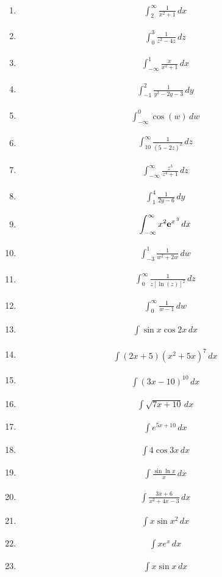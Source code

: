 \documentclass[twoside, fleqn,12pt,letterpaper]{book}
\newcommand{\makeitem}[2]{\item {#2}\begin{align*} {#1}
  \end{align*}}
\newcommand{\makeitemblack}[1]{\makeitem{{#1}}{\cite{bprp}}}
\newcommand{\makeitemlamar}[1]{\makeitem{{#1}}{\cite{lamar}}}
\begin{document}
\begin{multicols}{2}
\begin{enumerate}
  \makeitemlamar{\displaystyle \int_{2}^{\infty }{{\frac{1}{{{x^2} + 1}}\,dx}}}
  
  \makeitemlamar{\displaystyle \int_{0}^{3}{{\frac{1}{{{z^2} - 4z}}\,dz}}}
  
  \makeitemlamar{\displaystyle \int_{{ - \infty }}^{1}{{\frac{x}{{{x^2} + 1}}\,dx}}}
  
  \makeitemlamar{\displaystyle \int_{{ - 1}}^{2}{{\frac{1}{{{y^2} - 2y - 3}}\,dy}}}
  
  \makeitemlamar{\displaystyle \int_{{ - \infty }}^{0}{{\cos \left( w \right)\,dw}}}
  
  \makeitemlamar{\displaystyle \int_{{10}}^{\infty }{{\frac{1}{{{{\left( {5 - 2z} \right)}^2}}}\,dz}}}
  
  \makeitemlamar{\displaystyle \int_{{ - \infty }}^{\infty }{{\frac{{{z^3}}}{{{z^4} + 1}}\,dz}}}
  
  \makeitemlamar{\displaystyle \int_{1}^{4}{{\frac{1}{{2y - 6}}\,dy}}}
  
  \makeitemlamar{\displaystyle \int_{{ - \infty }}^{\infty }{{{x^2}{{\bf{e}}^{{x^{\,3}}}}\,dx}}}
  
  \makeitemlamar{\displaystyle \int_{{ - 3}}^{1}{{\frac{1}{{{w^2} + 2w}}\,dw}}}
  
  \makeitemlamar{\displaystyle \int_{0}^{\infty }{{\frac{1}{{z{{\left[ {\ln \left( z \right)} \right]}^2}}}\,dz}}}
  
  \makeitemlamar{\displaystyle \int_{0}^{\infty }{{\frac{1}{{w - 1}}\,dw}}}
  
  \makeitemblack{\int \sin{x}\cos{2x} \, dx}
  
  \makeitem{\int (2x+5) (x^2+5x)^7 \, dx}{\cite{Prinecton}} 
  
  \makeitem{\int (3x-10)^10 \, dx}{\cite{Prinecton}}
  
  \makeitem{\int \sqrt{7x+10} \, dx}{\cite{Prinecton}} 
  
  \makeitem{\int e^{5x+10} \, dx}{\cite{Prinecton}} 
  
  \makeitem{\int 4\cos{3x} \, dx}{\cite{Prinecton}} 
  
  \makeitem{\int \frac{\sin{\ln{x}}}{x} \, dx }{\cite{Prinecton}}
  
  \makeitem{\int \frac{3x+6}{x^2+4x-3} \, dx}{\cite{Prinecton}}
  
  \makeitem{\int x\sin{x^2} \, dx}{\cite{Prinecton}}
  
  \makeitem{\int xe^x \, dx}{\cite{Prinecton}} 
  
  \makeitem{\int x\sin{x} \, dx}{\cite{Prinecton}}
  

\end{enumerate}
\end{multicols}
\end{document}
